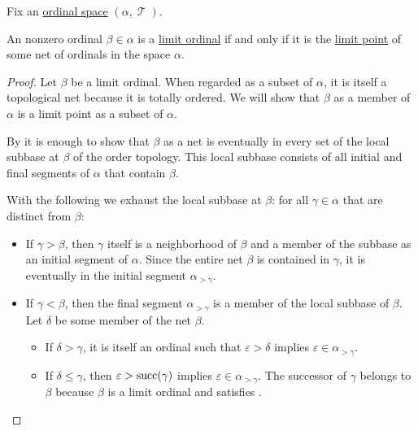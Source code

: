 \begin{proposition}\label{thm:limit_ordinal_order_topology}
  Fix an \hyperref[def:ordinal_space]{ordinal space} \( (\alpha, \mscrT) \).

  An nonzero ordinal \( \beta \in \alpha \) is a \hyperref[def:successor_and_limit_ordinal]{limit ordinal} if and only if it is the \hyperref[def:net_convergence/limit]{limit point} of some net of ordinals in the space \( \alpha \).
\end{proposition}
\begin{proof}
  \SufficiencySubProof Let \( \beta \) be a limit ordinal. When regarded as a subset of \( \alpha \), it is itself a topological net because it is totally ordered. We will show that \( \beta \) as a member of \( \alpha \) is a limit point as a subset of \( \alpha \).

  By  it is enough to show that \( \beta \) as a net is eventually in every set of the local subbase at \( \beta \) of the order topology. This local subbase consists of all initial and final segments of \( \alpha \) that contain \( \beta \).

  With the following we exhaust the local subbase at \( \beta \): for all \( \gamma \in \alpha \) that are distinct from \( \beta \):
  \begin{itemize}
    \item If \( \gamma > \beta \), then \( \gamma \) itself is a neighborhood of \( \beta \) and a member of the subbase as an initial segment of \( \alpha \). Since the entire net \( \beta \) is contained in \( \gamma \), it is eventually in the initial segment \( \alpha_{>\gamma} \).

    \item If \( \gamma < \beta \), then the final segment \( \alpha_{>\gamma} \) is a member of the local subbase of \( \beta \). Let \( \delta \) be some member of the net \( \beta \).
    \begin{itemize}
      \item If \( \delta > \gamma \), it is itself an ordinal such that \( \varepsilon > \delta \) implies \( \varepsilon \in \alpha_{>\gamma} \).
      \item If \( \delta \leq \gamma \), then \( \varepsilon > \operatorname{succ}(\gamma) \) implies \( \varepsilon \in \alpha_{>\gamma} \). The successor of \( \gamma \) belongs to \( \beta \) because \( \beta \) is a limit ordinal and satisfies .
    \end{itemize}


\end{itemize}
\end{proof}
